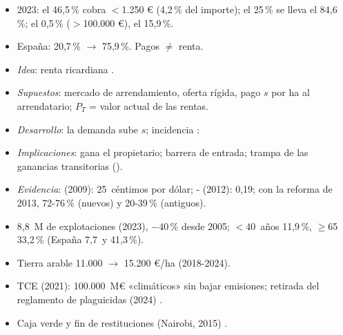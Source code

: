 \documentclass{article}
\begin{document}
\begin{columnas}
\begin{itemize}
\item 2023: el 46,5\,\% cobra $<$1.250 € (4,2\,\% del importe); el 25\,\% se lleva el 84,6\,\%; el 0,5\,\% ($>$100.000 €), el 15,9\,\%.
\item España: 20,7\,\% $\to$ 75,9\,\%. Pagos $\neq$ renta.
\end{itemize}
\begin{itemize}
\item \emph{Idea}: renta ricardiana .
\item \emph{Supuestos}: mercado de arrendamiento, oferta rígida, pago $s$ por ha al arrendatario; $P_T$ = valor actual de las rentas.
\item \emph{Desarrollo}: la demanda sube $s$; incidencia :
\item \emph{Implicaciones}: gana el propietario; barrera de entrada; trampa de las ganancias transitorias ().
\item \emph{Evidencia}:  (2009): 25~céntimos por dólar; - (2012): 0,19; con la reforma de 2013, 72-76\,\% (nuevos) y 20-39\,\% (antiguos).
\end{itemize}
\begin{itemize}
\item 8,8~M de explotaciones (2023), $-$40\,\% desde 2005; $<$40~años 11,9\,\%, $\geq$65 33,2\,\% (España 7,7~y 41,3\,\%).
\item Tierra arable 11.000 $\to$ 15.200 €/ha (2018-2024).
\item TCE (2021): 100.000~M€ «climáticos» sin bajar emisiones; retirada del reglamento de plaguicidas (2024) .
\end{itemize}
\begin{itemize}
\item Caja verde y fin de restituciones (Nairobi, 2015) .

\end{itemize}
\end{columnas}
\end{document}
